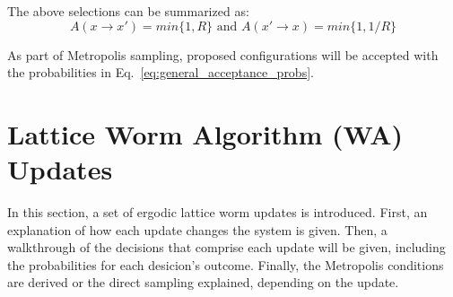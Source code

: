 \documentclass[12pt, two sided]{article}
\begin{document}
The above selections can be summarized as:
%
\begin{equation}
\label{eq:general_acceptance_probs}
A(x \to x') = min\{1,R\} \text{ and } A(x' \to x) = min\{1,1/R\}
\end{equation}
%

As part of Metropolis sampling, proposed configurations will be accepted with the probabilities in Eq.~\eqref{eq:general_acceptance_probs}.

\section{Lattice Worm Algorithm (WA) Updates}

In this section, a set of ergodic lattice worm updates is introduced. First, an explanation of how each update changes the system is given. Then, a walkthrough of the decisions that comprise each update will be given, including the probabilities for each desicion's outcome. Finally, the Metropolis conditions are derived or the direct sampling explained, depending on the update.
\end{document}
